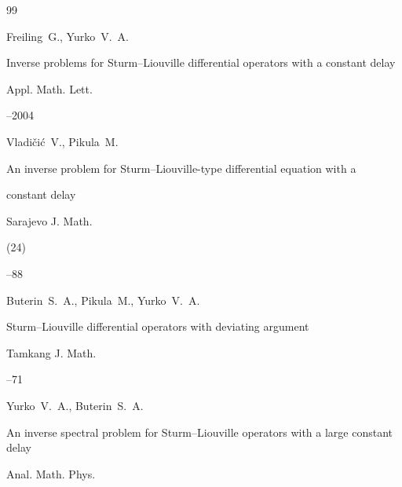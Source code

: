 \begin{thebibliography}{99}

\by Freiling~G., Yurko~V.~A.

\paper Inverse problems for Sturm--Liouville differential operators with a constant delay 

\jour Appl. Math. Lett. 





–2004






\by Vladi\v{c}i\'{c}~V., Pikula~M. 

\paper An inverse problem for Sturm–Liouville-type differential equation with a

constant delay


\jour Sarajevo J. Math.


(24)


–88






\by Buterin~S.~A., Pikula~M., Yurko~V.~A. 

\paper Sturm--Liouville differential operators with deviating argument


\jour Tamkang J. Math.




–71




\by Yurko~V.~A., Buterin~S.~A. 

\paper An inverse spectral problem for Sturm–Liouville operators with a large constant delay

\jour Anal. Math. Phys. 







\end{thebibliography}
